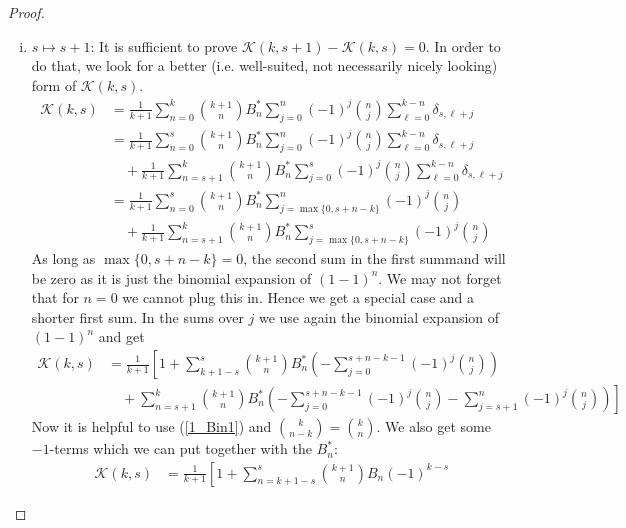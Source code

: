 \begin{proof}
\begin{subproof}
\begin{enumerate}[(i)]
		  \item $s \mapsto s+1$:
			It is sufficient to prove 
			$\mathcal{K}(k,s+1) - \mathcal{K}(k,s) = 0$.
			In order to do that, we look for a better (i.e. well-suited, not
			necessarily nicely looking) form of $\mathcal{K}(k,s)$.
			\begin{align*}
				\mathcal{K}(k,s)
				& = 
				\frac{1}{k + 1}	\sum\limits_{n=0}^k
				\binom{k+1}{n} B_n^* \sum\limits_{j=0}^n
				(-1)^j \binom{n}{j} \sum\limits_{\ell=0}^{k-n}
				\delta_{s, \ell+j}\\
				& = 
				\frac{1}{k + 1} \sum\limits_{n=0}^s
				\binom{k+1}{n} B_n^* \sum\limits_{j=0}^n
				(-1)^j \binom{n}{j} \sum\limits_{\ell=0}^{k-n}
				\delta_{s, \ell+j} \\
				& \quad + \frac{1}{k + 1} \sum\limits_{n=s+1}^k
				\binom{k+1}{n} B_n^* \sum\limits_{j=0}^s
				(-1)^j \binom{n}{j} \sum\limits_{\ell=0}^{k-n}
				\delta_{s, \ell+j} \\
				& = \frac{1}{k + 1} \sum\limits_{n=0}^s
				\binom{k+1}{n} B_n^* 
				\sum\limits_{j=\max\{0, s+n-k\}}^n
				(-1)^j \binom{n}{j} \\
				& \quad + \frac{1}{k + 1}
				\sum\limits_{n=s+1}^k
				\binom{k+1}{n} B_n^*
				\sum\limits_{j=\max\{0, s+n-k\}}^s
				(-1)^j \binom{n}{j}
			\end{align*}
			As long as $\max\{0, s+n-k\} = 0$, the second sum in the first 
			summand will be zero as it is just the binomial expansion of 
			$(1-1)^n$. We may not forget that for $n=0$ we cannot plug this 
			in. Hence we get a special case and a shorter first sum. In the 
			sums over $j$ we use again the binomial expansion of $(1-1)^n$ and 
			get 
			\begin{align*}
				\mathcal{K}(k,s)
				& = 
				\frac{1}{k+1} \left[ 
				1 + \sum\limits_{k+1-s}^s 
				\binom{k+1}{n} B_n^* \left(
				- \sum\limits_{j=0}^{s+n-k-1} 
				(-1)^j \binom{n}{j}\right) \right. \\
				& \quad + \left. 
				\sum\limits_{n=s+1}^k 
				\binom{k+1}{n} B_n^* \left( 
				- \sum\limits_{j=0}^{s+n-k-1} 
				(-1)^j\binom{n}{j} - 
				\sum\limits_{j=s+1}^n 
				(-1)^j \binom{n}{j} \right) \right]
			\end{align*}
			Now it is helpful to use (\ref{1_Bin1}) and 
			$\binom{k}{n-k} = \binom{k}{n}$. 
			We also get some $-1$-terms which we can put together with the 
			$B_n^*$:
			\begin{align*}
				\mathcal{K}(k,s)
				& = 
				\frac{1}{k+1} \left[
				1+ \sum\limits_{n=k+1-s}^s
				\binom{k+1}{n} B_n (-1)^{k-s}

\end{align*}
\end{enumerate}
\end{subproof}
\end{proof}
